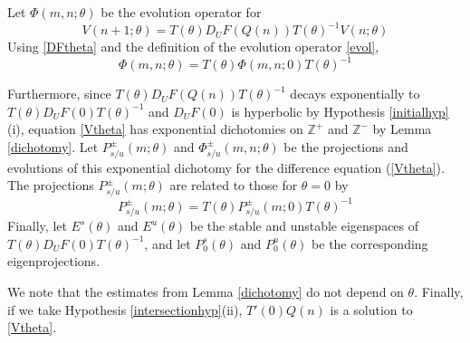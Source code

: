 \documentclass[12pt]{article}
\def\Z{{\mathbb Z}}
\begin{document}
Let $\Phi(m, n; \theta)$ be the evolution operator for
\begin{equation}\label{Vtheta}
V(n+1; \theta) = T(\theta) D_U F(Q(n)) T(\theta)^{-1} V(n; \theta) 
\end{equation}
Using \eqref{DFtheta} and the definition of the evolution operator \eqref{evol},
\[
\Phi(m, n; \theta) = T(\theta)\Phi(m, n; 0)T(\theta)^{-1}
\]

Furthermore, since $T(\theta) D_U F(Q(n)) T(\theta)^{-1}$ decays exponentially to $T(\theta) D_U F(0) T(\theta)^{-1}$ and $D_U F(0)$ is hyperbolic by Hypothesis \ref{initialhyp}(i), equation \eqref{Vtheta} has exponential dichotomies on $\Z^+$ and $\Z^-$ by Lemma \ref{dichotomy}. Let $P_{s/u}^\pm(m; \theta)$ and $\Phi_{s/u}^\pm(m, n; \theta)$ be the projections and evolutions of this exponential dichotomy for the difference equation (\ref{Vtheta}). The projections $P_{s/u}^\pm(m; \theta)$ are related to those for $\theta = 0$ by
\[
P_{s/u}^\pm(m; \theta) = T(\theta)P_{s/u}^\pm(m; 0)T(\theta)^{-1}
\]
Finally, let $E^s(\theta)$ and $E^u(\theta)$ be the stable and unstable eigenspaces of $T(\theta) D_U F(0) T(\theta)^{-1}$, and let $P_0^s(\theta)$ and $P_0^u(\theta)$ be the corresponding eigenprojections.

We note that the estimates from Lemma \ref{dichotomy} do not depend on $\theta$. Finally, if we take Hypothesis \ref{intersectionhyp}(ii), $T'(0) Q(n)$ is a solution to \eqref{Vtheta}.
\end{document}

